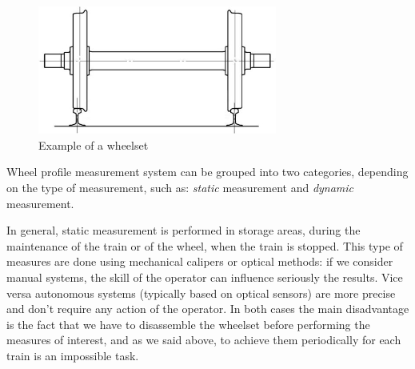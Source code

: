   \begin{figure}[h!]
    \centering
    \includegraphics[width=0.7\textwidth]{./images/wpms/assile.jpg}
    \caption{Example of a wheelset}
    \label{fig:wheelset}
  \end{figure}


\clearpage


Wheel profile measurement system can be grouped into two categories, depending on the type of measurement, such as: \textit{static} measurement and \textit{dynamic} measurement.

In general, static measurement is performed in storage areas, during the maintenance of the train or of the wheel, when the train is stopped. This type of measures are done using mechanical calipers or optical methods: if we consider manual systems, the skill of the operator can influence seriously the results. Vice versa autonomous systems (typically based on optical sensors) are more precise and don't require any action of the operator. In both cases the main disadvantage is the fact that we have to disassemble the wheelset before performing the measures of interest, and as we said above, to achieve them periodically for each train is an impossible task.

